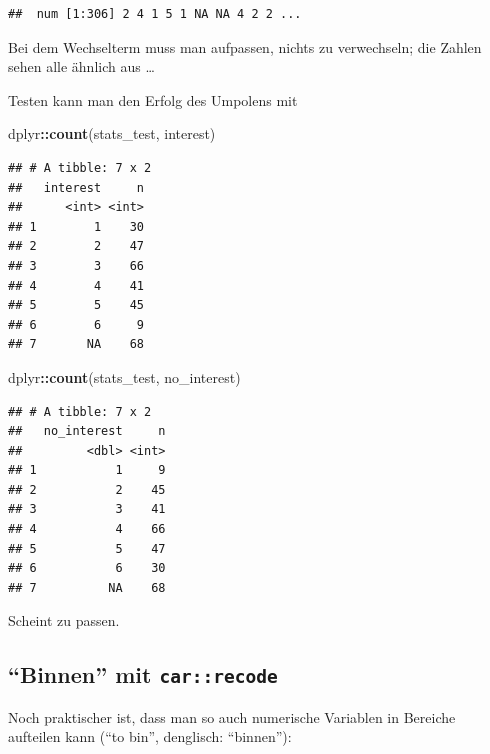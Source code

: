 \documentclass[12pt,ngerman,paper=a4,pagesize,DIV=13]{scrreprt}
\newenvironment{Shaded}{\begin{snugshade}}{\end{snugshade}}
\newcommand{\KeywordTok}[1]{\textcolor[rgb]{0.13,0.29,0.53}{\textbf{#1}}}
\newcommand{\NormalTok}[1]{#1}
\newcommand{\OperatorTok}[1]{\textcolor[rgb]{0.81,0.36,0.00}{\textbf{#1}}}
\newcommand{\StringTok}[1]{\textcolor[rgb]{0.31,0.60,0.02}{#1}}
\begin{document}
\begin{verbatim}
##  num [1:306] 2 4 1 5 1 NA NA 4 2 2 ...
\end{verbatim}

Bei dem Wechselterm muss man aufpassen, nichts zu verwechseln; die
Zahlen sehen alle ähnlich aus \dots

Testen kann man den Erfolg des Umpolens mit

\begin{Shaded}
\begin{Highlighting}[]
\NormalTok{dplyr}\OperatorTok{::}\KeywordTok{count}\NormalTok{(stats_test, interest)}
\end{Highlighting}
\end{Shaded}

\begin{verbatim}
## # A tibble: 7 x 2
##   interest     n
##      <int> <int>
## 1        1    30
## 2        2    47
## 3        3    66
## 4        4    41
## 5        5    45
## 6        6     9
## 7       NA    68
\end{verbatim}

\begin{Shaded}
\begin{Highlighting}[]
\NormalTok{dplyr}\OperatorTok{::}\KeywordTok{count}\NormalTok{(stats_test, no_interest)}
\end{Highlighting}
\end{Shaded}

\begin{verbatim}
## # A tibble: 7 x 2
##   no_interest     n
##         <dbl> <int>
## 1           1     9
## 2           2    45
## 3           3    41
## 4           4    66
## 5           5    47
## 6           6    30
## 7          NA    68
\end{verbatim}

Scheint zu passen.

\hypertarget{binnen-mit-carrecode}{%
\subsection{\texorpdfstring{\enquote{Binnen} mit
\texttt{car::recode}}{``Binnen'' mit car::recode}}\label{binnen-mit-carrecode}}

Noch praktischer ist, dass man so auch numerische Variablen in Bereiche
aufteilen kann (\enquote{to bin}, denglisch: \enquote{binnen}):

\begin{Shaded}
\end{Shaded}
\end{document}

